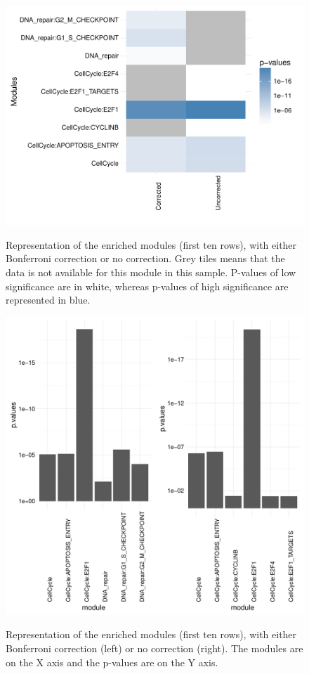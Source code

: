 \documentclass[article]{jss}
\begin{document}
\begin{figure}
	\centering
    \caption{Representation of the enriched modules (first ten rows), with
    either Bonferroni correction or no correction. Grey tiles means that the
    data is not available for this module in this sample. P-values of low
    significance are in white, whereas p-values of high significance are
    represented in blue.}
    \includegraphics{figures/comparison_corrected_unc.pdf}
    \label{fig:heatm}

\end{figure}


\begin{figure}
	\caption{Representation of the enriched modules (first ten rows), with either Bonferroni correction (left) or no correction (right). The modules are on the X axis and the p-values are on the Y axis.  }
	\includegraphics{figures/comparison_corrected_unc_bars.pdf}
	\label{fig:barp}

\end{figure}
\end{document}
